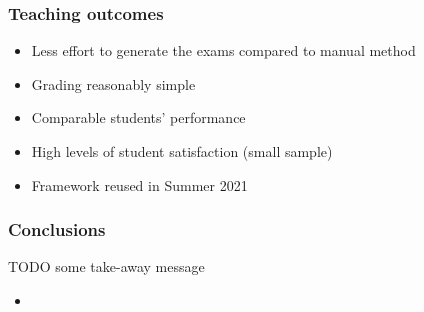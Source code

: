 \documentclass[xcolor={table}]{beamer}
\begin{document}
\begin{frame}
\frametitle{Teaching outcomes}
\begin{itemize}
\item Less effort to generate the exams compared to manual method
\item Grading reasonably simple
\item Comparable students' performance
\item High levels of student satisfaction (small sample)
\item Framework reused in Summer 2021
\end{itemize}
\end{frame}



\begin{frame}
\frametitle{Conclusions}
TODO some take-away message
\begin{itemize}
\item
\end{itemize}
\end{frame}

\end{document}
